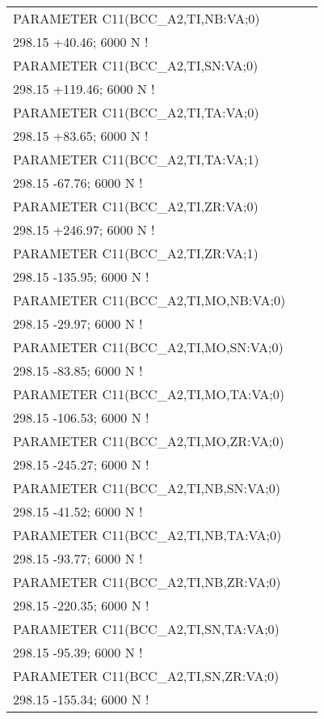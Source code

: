 \begin{longtable}[H]{ l l l }
	PARAMETER C11(BCC\_A2,TI,NB:VA;0) & & \\
	\multicolumn{3}{l}{298.15 +40.46;     6000 N !}\\
	PARAMETER C11(BCC\_A2,TI,SN:VA;0) & & \\
	\multicolumn{3}{l}{298.15 +119.46;    6000 N !}\\
	PARAMETER C11(BCC\_A2,TI,TA:VA;0) & & \\
	\multicolumn{3}{l}{298.15 +83.65;     6000 N !}\\
	PARAMETER C11(BCC\_A2,TI,TA:VA;1) & & \\
	\multicolumn{3}{l}{298.15 -67.76;     6000 N !}\\
	PARAMETER C11(BCC\_A2,TI,ZR:VA;0) & & \\
	\multicolumn{3}{l}{298.15 +246.97;    6000 N !}\\
	PARAMETER C11(BCC\_A2,TI,ZR:VA;1) & & \\
	\multicolumn{3}{l}{298.15 -135.95;    6000 N !}\\
	PARAMETER C11(BCC\_A2,TI,MO,NB:VA;0) & & \\
	\multicolumn{3}{l}{298.15 -29.97;     6000 N !}\\   
	PARAMETER C11(BCC\_A2,TI,MO,SN:VA;0) & & \\
	\multicolumn{3}{l}{298.15 -83.85;     6000 N !}\\    
	PARAMETER C11(BCC\_A2,TI,MO,TA:VA;0) & & \\
	\multicolumn{3}{l}{298.15 -106.53;    6000 N !}\\    
	PARAMETER C11(BCC\_A2,TI,MO,ZR:VA;0) & & \\
	\multicolumn{3}{l}{298.15 -245.27;    6000 N !}\\    
	PARAMETER C11(BCC\_A2,TI,NB,SN:VA;0) & & \\
	\multicolumn{3}{l}{298.15 -41.52;     6000 N !}\\    
	PARAMETER C11(BCC\_A2,TI,NB,TA:VA;0) & & \\
	\multicolumn{3}{l}{298.15 -93.77;     6000 N !}\\   
	PARAMETER C11(BCC\_A2,TI,NB,ZR:VA;0) & & \\
	\multicolumn{3}{l}{298.15 -220.35;    6000 N !}\\
	PARAMETER C11(BCC\_A2,TI,SN,TA:VA;0) & & \\
	\multicolumn{3}{l}{298.15 -95.39;     6000 N !}\\ 
	PARAMETER C11(BCC\_A2,TI,SN,ZR:VA;0) & & \\
	\multicolumn{3}{l}{298.15 -155.34;    6000 N !}\\

\end{longtable}
